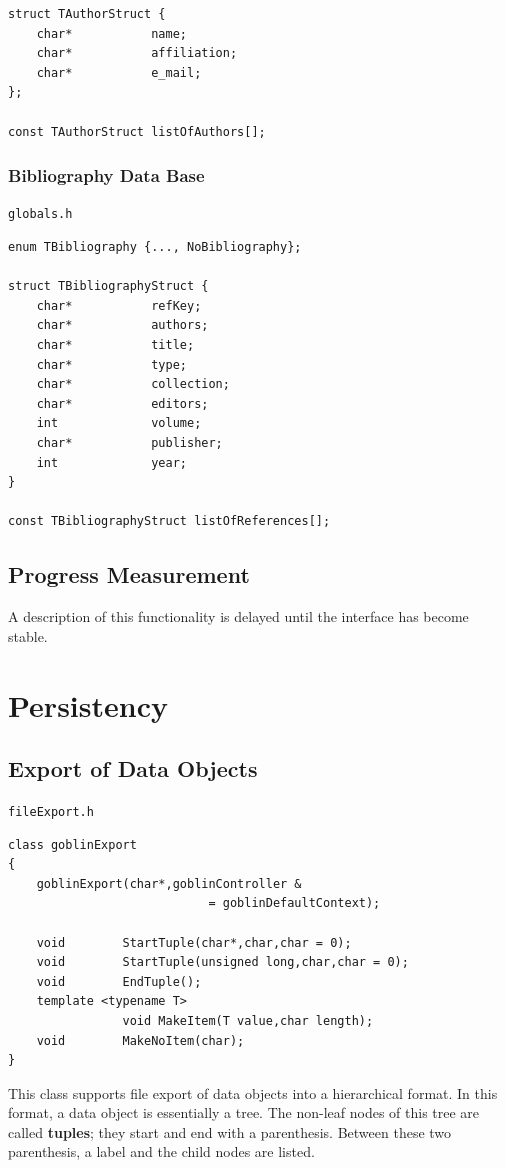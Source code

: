 \documentclass[a4paper,11pt,twoside]{book}
\begin{document}
\begin{multicols}{2}
\begin{mymethods}
\begin{verbatim}
struct TAuthorStruct {
    char*           name;
    char*           affiliation;
    char*           e_mail;
};

const TAuthorStruct listOfAuthors[];
\end{verbatim}
\end{mymethods}


\subsection{Bibliography Data Base}
\label{slb_bibliography}
\myincludes\verb/globals.h/
\begin{mymethods}
\begin{verbatim}
enum TBibliography {..., NoBibliography};

struct TBibliographyStruct {
    char*           refKey;
    char*           authors;
    char*           title;
    char*           type;
    char*           collection;
    char*           editors;
    int             volume;
    char*           publisher;
    int             year;
}

const TBibliographyStruct listOfReferences[];
\end{verbatim}
\end{mymethods}


\section{Progress Measurement}
\label{slb_progress}
A description of this functionality is delayed until the interface has become
stable.



\cleardoublepage
{}
\chapter{Persistency}
\thispagestyle{fancy}
\label{clb8}

\section{Export of Data Objects}
\myinclude\verb/fileExport.h/
\begin{mymethods}
\begin{verbatim}
class goblinExport
{
    goblinExport(char*,goblinController &
                            = goblinDefaultContext);

    void        StartTuple(char*,char,char = 0);
    void        StartTuple(unsigned long,char,char = 0);
    void        EndTuple();
    template <typename T>
                void MakeItem(T value,char length);
    void        MakeNoItem(char);
}
\end{verbatim}
\end{mymethods}
This class supports file export of data objects into a hierarchical format.
In this format, a data object is essentially a tree. The non-leaf nodes of this
tree are called {\bf tuples}; they start and end with
a parenthesis. Between these two parenthesis, a label and the child nodes are
listed.


\end{multicols}
\end{document}
